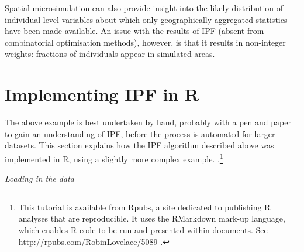 \documentclass[a4paper, 11pt, twoside]{article}
\begin{document}
Spatial microsimulation can also provide insight into the likely
distribution of individual level variables about which only
geographically aggregated statistics have been made available.
An issue
with the results of IPF (absent from combinatorial optimisation methods),
however, is that it results in non-integer weights: fractions of individuals
appear in simulated areas.

\section{Implementing IPF in R} \label{simplementing} %
The above example is best undertaken by hand, probably with a pen and paper
to gain an understanding of IPF, before the process is automated for 
larger datasets. This section explains how the IPF
algorithm described above was implemented in R, using a slightly more
complex example.
\citep{Lovelace2013-trs}.\footnote{This tutorial is available from Rpubs, a site dedicated
to publishing R analyses that are reproducible. It uses the RMarkdown
mark-up language, which enables R code to be run and presented within
documents. See http://rpubs.com/RobinLovelace/5089 \label{fnrpub} .}

\emph{Loading in the data}
\end{document}
